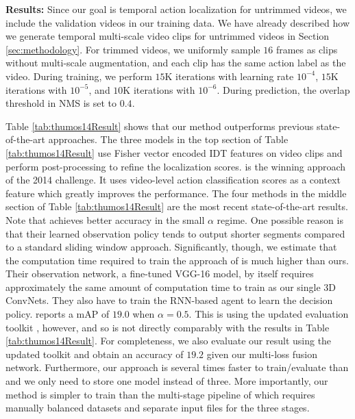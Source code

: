 \documentclass[10pt,twocolumn,letterpaper]{article}
\begin{document}
\noindent \textbf{Results:}
Since our goal is temporal action localization for untrimmed videos, we include the validation videos in our training data. We have already described how we generate temporal multi-scale video clips for untrimmed videos in Section \ref{sec:methodology}. For trimmed videos, we uniformly sample $16$ frames as clips without multi-scale augmentation, and each clip has the same action label as the video. 
During training, we perform $15$K iterations with learning rate $10^{-4}$, $15$K iterations with $10^{-5}$, and $10$K iterations with $10^{-6}$. During prediction, the overlap threshold in NMS is set to $0.4$.

Table \ref{tab:thumos14Result} shows that our method outperforms previous state-of-the-art approaches.
The three models in the top section of Table \ref{tab:thumos14Result} use Fisher vector encoded IDT features on video clips and perform post-processing to refine the localization scores. \cite{learThumos2014} is the winning approach of the 2014 challenge. It uses video-level action classification scores as a context feature which greatly improves the performance.
The four methods in the middle section of Table \ref{tab:thumos14Result} are the most recent state-of-the-art results. 
Note that \cite{frame_glimpse_yeung_cvpr16} achieves better accuracy in the small $\alpha$ regime. One possible reason is that their learned observation policy tends to output shorter segments compared to a standard sliding window approach.
Significantly, though, we estimate that the computation time required to train the approach of \cite{frame_glimpse_yeung_cvpr16} is much higher than ours. Their observation network, a fine-tuned VGG-16 model, by itself requires approximately the same amount of computation time to train as our single 3D ConvNets. They also have to train the RNN-based agent to learn the decision policy.
\cite{scnn_shou_wang_chang_cvpr16} reports a mAP of $19.0$ when $\alpha = 0.5$. This is using the updated evaluation toolkit \cite{THUMOS14}, however, and so is not directly comparably with  the results in Table \ref{tab:thumos14Result}. For completeness, we also evaluate our result using the updated toolkit and obtain an accuracy of $19.2$ given our multi-loss fusion network. 
Furthermore, our approach is several times faster to train/evaluate than \cite{scnn_shou_wang_chang_cvpr16} and we only need to store one model instead of three. More importantly, our method is simpler to train than the multi-stage pipeline of \cite{scnn_shou_wang_chang_cvpr16} which requires manually balanced datasets and separate input files for the three stages.
\end{document}
